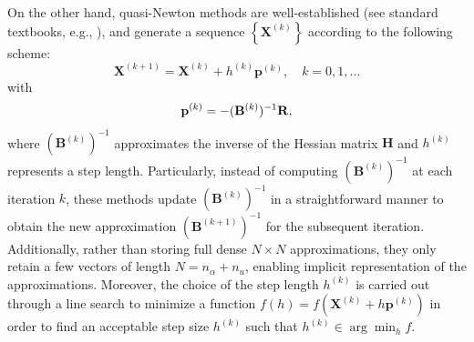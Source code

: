 \documentclass[10pt]{article}
\begin{document}
On the other hand, quasi-Newton methods are well-established (see standard textbooks, e.g., \cite{Nocedal1999-zr,Nocedal2006-qh}), and generate a sequence $\left\{\mathbf{X}^{(k)}\right\}$ according to the following scheme:
\begin{equation}
\mathbf{X}^{(k+1)} = \mathbf{X}^{(k)} + h^{(k)} \mathbf{p} ^{(k)}, \quad k=0,1,\ldots
\end{equation}
with
\begin{equation}
\mathbf{p}^{(k)}=-(\mathbf{B}^{(k)})^{-1}{\bf R},
\end{equation}
where $(\mathbf{B}^{(k)})^{-1}$ approximates the inverse of the Hessian matrix  $\mathbf{H}$ and $h^{(k)}$ represents a step length. Particularly, instead of computing $(\mathbf{B}^{(k)})^{-1}$  at each iteration $k$, these methods update $(\mathbf{B}^{(k)})^{-1}$ in a straightforward manner to obtain the new approximation $(\mathbf{B}^{(k+1)})^{-1}$  for the subsequent iteration. Additionally, rather than storing full dense $N \times N$ approximations, they only retain a few vectors of length $N=n_\alpha + n_u$, enabling implicit representation of the approximations. Moreover, the choice of the step length $h^{(k)}$ is carried out through a line search to minimize a function $f(h) = f(\mathbf{X}^{(k)} + h \mathbf{p}^{(k)})$ in order to find an acceptable step size $h^{(k)}$ such that $h^{(k)} \in \arg \min_{h} f$.
\end{document}
